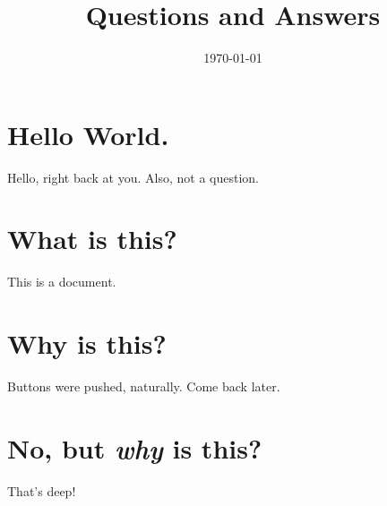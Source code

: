 \documentclass[11pt,letterpaper]{article}
\author{}
\title{Questions and Answers}
\date{\today}
\begin{document}
\maketitle

\section{Hello World.}
Hello, right back at you. Also, not a question.

\section{What is this?}
This is a document.

\section{Why is this?}
Buttons were pushed, naturally. Come back later.

\section{No, but \textit{why} is this?}
That's deep!
\end{document}
